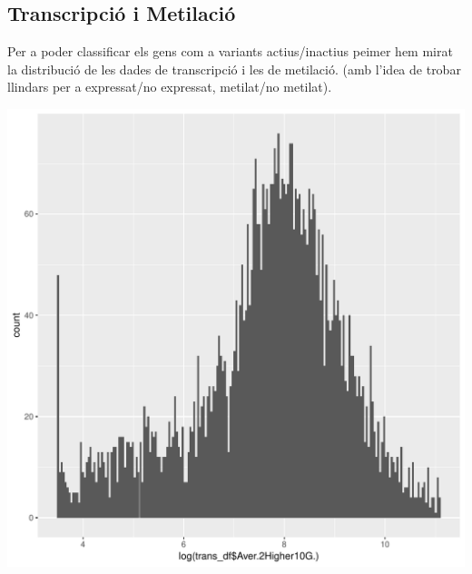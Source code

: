 \documentclass{article}\usepackage[]{graphicx}\usepackage[]{color}
\newenvironment{knitrout}{}{} %
\begin{document}
\subsection{Transcripció i Metilació}
Per a poder classificar els gens com a variants actius/inactius peimer hem mirat la distribució de les dades de transcripció i les de metilació. (amb l'idea de trobar llindars per a expressat/no expressat, metilat/no metilat).
\begin{knitrout}
\color{fgcolor}

{\centering \includegraphics[width=1\linewidth]{figure/minimal-trans_histo-1} 

}



\end{knitrout}
\clearpage
\end{document}
